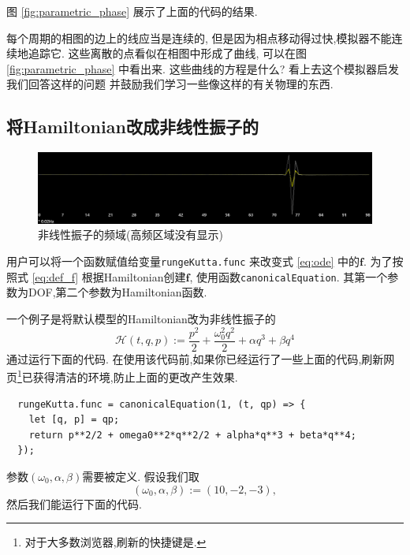 \documentclass[12pt]{article}
\begin{document}
图 \ref{fig:parametric_phase} 展示了上面的代码的结果.

每个周期的相图的边上的线应当是连续的,
但是因为相点移动得过快,模拟器不能连续地追踪它.
这些离散的点看似在相图中形成了曲线,
可以在图 \ref{fig:parametric_phase} 中看出来.
这些曲线的方程是什么?
看上去这个模拟器启发我们回答这样的问题
并鼓励我们学习一些像这样的有关物理的东西.

\subsection{将Hamiltonian改成非线性振子的}

\begin{figure}
  \centering
  \includegraphics[width=0.9\linewidth]{nonlinear_frequency.png}
  \caption{非线性振子的频域(高频区域没有显示)}
  \label{fig:nonlinear}
\end{figure}

用户可以将一个函数赋值给变量\texttt{rungeKutta.func}
来改变式 \ref{eq:ode} 中的$\mathbf f$.
为了按照式 \ref{eq:def_f} 根据Hamiltonian创建$\mathbf f$,
使用函数\texttt{canonicalEquation}.
其第一个参数为DOF,第二个参数为Hamiltonian函数.

一个例子是将默认模型的Hamiltonian改为非线性振子的
\begin{equation*}
  \mathcal H\left(t,q,p\right):=\frac{p^2}2+\frac{\omega_0^2q^2}2+\alpha q^3+\beta q^4
\end{equation*}
通过运行下面的代码.
在使用该代码前,如果你已经运行了一些上面的代码,刷新网页\footnote{
  对于大多数浏览器,刷新的快捷键是.
}已获得清洁的环境,防止上面的更改产生效果.

\begin{verbatim}
  rungeKutta.func = canonicalEquation(1, (t, qp) => {
    let [q, p] = qp;
    return p**2/2 + omega0**2*q**2/2 + alpha*q**3 + beta*q**4;
  });
\end{verbatim}

参数$\left(\omega_0,\alpha,\beta\right)$需要被定义.
假设我们取
\begin{equation*}
  \left(\omega_0,\alpha,\beta\right):=\left(10,-2,-3\right),
\end{equation*}
然后我们能运行下面的代码.
\end{document}
